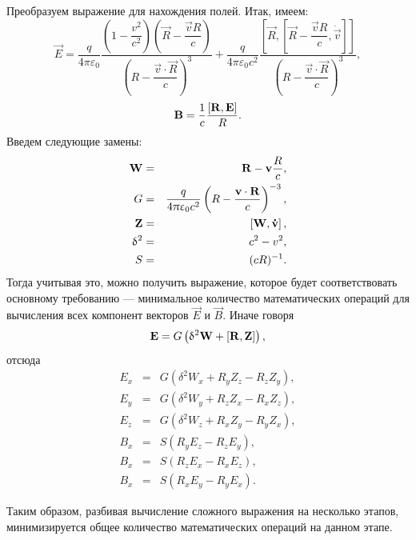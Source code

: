 Преобразуем выражение для нахождения полей. Итак, имеем:
\begin{equation}
\vec{E} = \dfrac{q}{4 \pi \varepsilon_0} \dfrac{\left( 1 - \dfrac{v^2}{c^2} \right) \left( \vec{R} - \dfrac{\vec{v} R}{c}  \right) }{\left( R - \dfrac{\vec{v} \cdot \vec{ R}}{c} \right)^3} + \dfrac{q}{4 \pi \varepsilon_0 c^2} \dfrac{\left[ \vec{R} , \left[ \vec{R} - \dfrac{\vec{v}R}{c} , \dot{\vec{v}}  \right]  \right]}{\left( R - \dfrac{\vec{v} \cdot \vec{ R}}{c} \right)^3},
\label{eq:opt_LV_E}
\end{equation}
\begin{equation}
\mathbf{B} = \frac{1}{c} \frac{\left[ \mathbf{{R}},\mathbf{{E}} \right]}{R}.
\label{eq:opt_LV_B}
\end{equation}
Введем следующие замены:
\begin{eqnarray}
\mathbf{W} &=& \mathbf{R} - \mathbf{v}\frac{R}{c}, \\
G &=& \frac{q}{4\uppi\upvarepsilon_0 c^2} \left( R - \frac{\mathbf{v} \cdot \mathbf{R}}{c} \right)^{-3}, \\
\mathbf{Z} &=& \left[ \mathbf{{W}},\mathbf{{\dot{v}}} \right], \\
\updelta^2 &=& c^2 - v^2, \\
S &=& (cR)^{-1}.
\end{eqnarray}
Тогда учитывая это, можно получить выражение, которое будет соответствовать основному требованию --- минимальное количество математических операций для вычисления всех  компонент векторов $\vec{E}$ и $\vec{B}$. Иначе говоря
\begin{equation}
\mathbf{E} = G \left( \updelta^2 \mathbf{W} + \left[ \mathbf{{R}},\mathbf{{Z}} \right]  \right),
\end{equation}
отсюда
\begin{eqnarray}
E_x &=& G \left( \delta^2 W_x + R_yZ_z - R_z Z_y  \right), \\
E_y &=& G \left( \delta^2 W_y + R_zZ_x - R_x Z_z  \right), \\
E_z &=& G \left( \delta^2 W_z + R_xZ_y - R_y Z_x  \right), \\
B_x &=& S \left( R_y E_z - R_z E_y \right), \\
B_x &=& S \left( R_z E_x - R_x E_z \right), \\
B_x &=& S \left( R_x E_y - R_y E_x \right). 
\end{eqnarray}

Таким образом, разбивая вычисление сложного выражения на несколько этапов, минимизируется общее количество математических операций на данном этапе.


